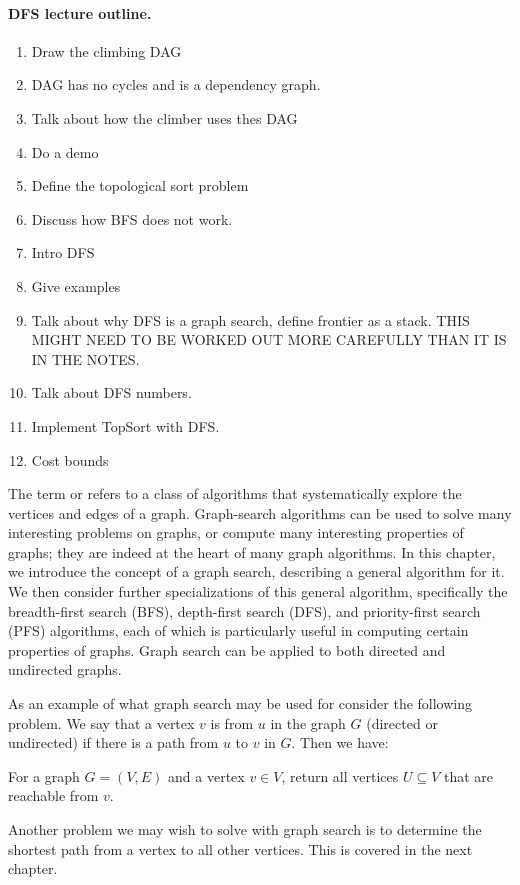 \begin{notesonly}
\paragraph{DFS lecture outline.}
\begin{enumerate}
\item Draw the climbing DAG
\item DAG has no cycles and is  a dependency graph.
\item Talk about how the climber uses thes DAG
\item Do a demo
\item Define the topological sort problem 
\item Discuss how BFS does not work.
\item Intro DFS
\item Give examples
\item Talk about why DFS is a graph search, define frontier as a
  stack.  THIS MIGHT NEED TO BE WORKED OUT MORE CAREFULLY THAN IT IS
  IN THE NOTES.

\item Talk about DFS numbers.
\item Implement TopSort with DFS.
\item Cost bounds
\end{enumerate}

\end{notesonly}
 
The term  or  refers to a class
of algorithms that systematically explore the vertices and edges of a
graph.  Graph-search algorithms can be used to solve many interesting
problems on graphs, or compute many interesting properties of graphs; they are indeed at the heart of many
graph algorithms.
% 
In this chapter, we introduce the concept of a graph search,
describing a general algorithm for it.
%
We then consider further specializations of this general algorithm,
specifically the breadth-first search (BFS), depth-first search (DFS),
and priority-first search (PFS) algorithms, each of which is
particularly useful in computing certain properties of graphs.   
Graph search can be applied to both directed and undirected graphs.

As an example of what graph search may be used for consider the
following problem.  We say that a vertex $v$ is  from
$u$ in the graph $G$ (directed or undirected) if there is a path from
$u$ to $v$ in $G$.  Then we have:
\begin{problem}
For a graph $G = (V,E)$ and a vertex $v \in V$, return all vertices $U
\subseteq V$ that are reachable from $v$.
\end{problem}
Another problem
we may wish to solve with graph search is to determine the shortest 
path from a vertex to all other vertices.     This is covered in the
next chapter.

